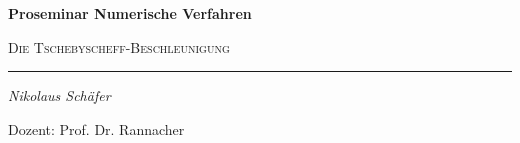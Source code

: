 \documentclass[12pt,a4paper,numbers=endperiod]{scrartcl}
\theoremstyle{definition}
\def\Namen{} %
\def\Datum{} %
\begin{document}
\Namen \hfill \Datum\par

\vspace{\baselineskip}
\vspace{\baselineskip}
\vspace{\baselineskip}
\vspace{\baselineskip}
\vspace{\baselineskip}

\begin{center}
{\LARGE\textbf{Proseminar Numerische Verfahren}}\par
\vspace{0.25\baselineskip}
{\large\textsc{Die Tschebyscheff-Beschleunigung}}
\end{center}
\hrule

\vspace{\baselineskip}
\vspace{\baselineskip}
\vspace{\baselineskip}
\vspace{\baselineskip}
\vspace{\baselineskip}
\vspace{\baselineskip}
\vspace{\baselineskip}
\vspace{\baselineskip}
\vspace{\baselineskip}
\vspace{\baselineskip}




\begin{center}
	{\large\itshape Nikolaus Schäfer}
\end{center}

\vspace{\baselineskip}
\vspace{\baselineskip}
\vspace{\baselineskip}
\vspace{\baselineskip}
\vspace{\baselineskip}
\vspace{\baselineskip}
\vspace{\baselineskip}
\vspace{\baselineskip}
\vspace{\baselineskip}
\vspace{\baselineskip}

\begin{center}
	{\large Dozent: Prof. Dr. Rannacher}
\end{center}
\vspace{\baselineskip}
\vspace{\baselineskip}
\vspace{\baselineskip}
\vspace{\baselineskip}
\vspace{\baselineskip}
\vspace{\baselineskip}
\vspace{\baselineskip}
\vspace{\baselineskip}
\vspace{\baselineskip}
\vspace{\baselineskip}
\end{document}
